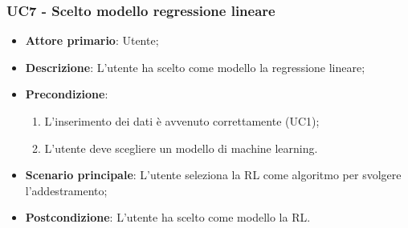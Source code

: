 \subsubsection{UC7 - Scelto modello regressione lineare}%
\label{sssec:uc7}
\begin{itemize}
  \item \textbf{Attore primario}: Utente;
  \item \textbf{Descrizione}: L'utente ha scelto come modello la regressione lineare;
  \item \textbf{Precondizione}:
  \begin{enumerate}
    \item L'inserimento dei dati è avvenuto correttamente (UC1);
    \item L'utente deve scegliere un modello di machine learning.
  \end{enumerate}
  \item \textbf{Scenario principale}: L'utente seleziona la RL come algoritmo per svolgere l'addestramento;
  \item \textbf{Postcondizione}: L'utente ha scelto come modello la RL.
\end{itemize}
